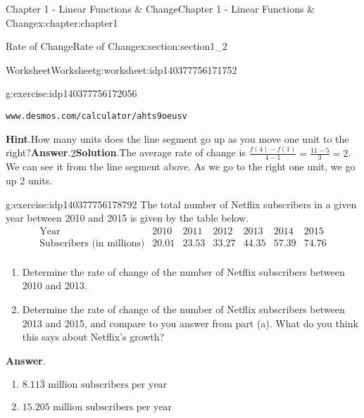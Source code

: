 \documentclass[oneside,10pt,]{book}
\newcommand{\blocktitlefont}{\relax}
\newcommand{\mono}[1]{\texttt{#1}}
\newlength{\qrsize}
\begin{document}
\begin{chapterptx}{Chapter 1 - Linear Functions \& Change}{}{Chapter 1 - Linear Functions \& Change}{}{}{x:chapter:chapter1}
\begin{sectionptx}{Rate of Change}{}{Rate of Change}{}{}{x:section:section1_2}
\begin{worksheet-subsection}{Worksheet}{}{Worksheet}{}{}{g:worksheet:idp140377756171752}
\begin{divisionexercise}{1}{}{}{g:exercise:idp140377756172056}
\begin{tcbraster}[raster columns=2, raster column skip=1pt, raster halign=center, raster force size=false, raster left skip=0pt, raster right skip=0pt]
\begin{tcolorbox}[qrstyle]%
{\hypersetup{urlcolor=black}}%
\end{tcolorbox}%
\begin{tcolorbox}[captionstyle]%
\small \mono{www.desmos.com/calculator/ahts9oeusv}\end{tcolorbox}%
\end{tcbraster}%
%
\textbf{\blocktitlefont Hint}.\hypertarget{g:hint:idp140377756176136}{}\quad{}How many units does the line segment go up as you move one unit to the right?\textbf{\blocktitlefont Answer}.\hypertarget{g:answer:idp140377756177400}{}\quad{}\(2\)\textbf{\blocktitlefont Solution}.\hypertarget{g:solution:idp140377756178088}{}\quad{}The average rate of change is \(\frac{f(4)-f(1)}{4-1} = \frac{11-5}{3}=2 \). We can see it from the line segment above. As we go to the right one unit, we go up 2 units.\end{divisionexercise}%
\begin{divisionexercise}{2}{}{}{g:exercise:idp140377756178792}%
The total number of Netflix subscribers\footnotemark{} in a given year between 2010 and 2015 is given by the table below.%
\begin{equation*}
\begin{array}{c|c|c|c|c|c|c}
\text{Year} & 2010 & 2011 & 2012 & 2013 & 2014 & 2015 \\
\hline \text{Subscribers (in millions)} & 20.01 & 23.53 & 33.27 & 44.35 & 57.39 & 74.76 \\
\end{array}
\end{equation*}
%
\begin{enumerate}[label=(\alph*)]
\item{}Determine the rate of change of the number of Netflix subscribers between 2010 and 2013.%
\item{}Determine the rate of change of the number of Netflix subscribers between 2013 and 2015, and compare to you answer from part (a). What do you think this says about Netflix's growth?%
\end{enumerate}
%
\textbf{\blocktitlefont Answer}.\hypertarget{g:answer:idp140377756183864}{}\quad{}%
\begin{enumerate}[label=(\alph*)]
\item{}\(\displaystyle 8.11\overline{3} \text{ million subscribers per year}\)%
\item{}\(\displaystyle 15.205 \text{ million subscribers per year}\)%
\end{enumerate}

\end{divisionexercise}
\end{worksheet-subsection}
\end{sectionptx}
\end{chapterptx}
\end{document}
